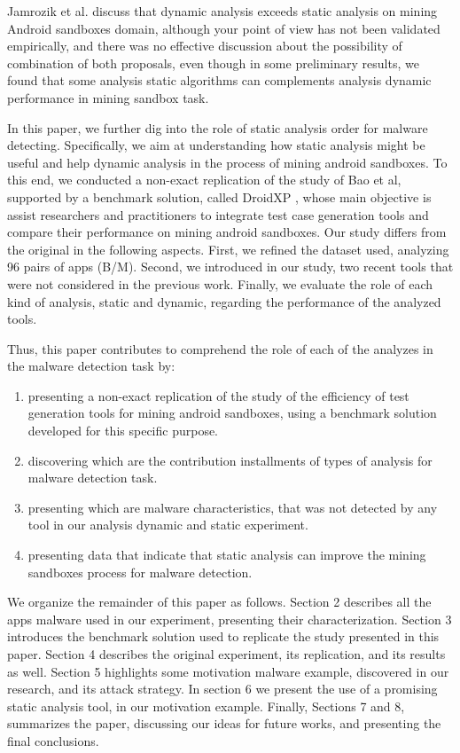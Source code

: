 Jamrozik et al. \cite{jamrozik2016mining} discuss that dynamic analysis exceeds static analysis on mining Android sandboxes domain, although your point of view has not been validated empirically, and there was no effective discussion about the possibility of combination of both proposals, even though in some preliminary results, we found that some analysis static algorithms can complements analysis dynamic performance in mining sandbox task.

In this paper, we further dig into the role of static analysis order for malware detecting. Specifically, we aim at understanding how static analysis might be useful and help dynamic analysis in the process of mining android sandboxes. To this end, we conducted a non-exact replication of the study of Bao et al, supported by a benchmark solution, called DroidXP \cite{dadroidxp}, whose main objective is  assist researchers and practitioners to integrate test case generation tools and compare their performance on mining android sandboxes. Our study differs from the original in the following aspects. First, we refined the dataset used, analyzing 96 pairs of apps (B/M). Second, we introduced in our study, two recent tools that were not considered in the previous work. Finally, we evaluate the role of each kind of analysis, static and dynamic, regarding the performance of the analyzed tools.

Thus, this paper contributes to comprehend the role of each of the analyzes in the malware detection task by:

\begin{enumerate}[(1)]
 \item presenting a non-exact replication of the study of the efficiency of test generation tools for mining android sandboxes, using a benchmark solution developed for this specific purpose.
 
 \item discovering which are the contribution installments of types of analysis for malware detection task.
 
 \item presenting which are malware characteristics, that was not detected by any tool in our analysis dynamic and static experiment.
 
 \item presenting data that indicate that static analysis can improve the mining sandboxes process for malware detection.
 \end{enumerate}
 
We organize the remainder of this paper as follows. Section 2 describes all the apps malware used in our experiment, presenting their characterization. Section 3 introduces the benchmark solution used to replicate the study presented in this paper. Section 4 describes the original experiment, its replication, and its results as well. Section 5 highlights some motivation malware example, discovered in our research, and its attack strategy. In section 6 we present the use of a promising static analysis tool, in our motivation example. Finally, Sections 7 and 8, summarizes the paper, discussing our ideas for future works, and presenting the final conclusions.
 



